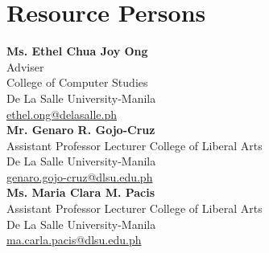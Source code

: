 %
%
%                 

\chapter{Resource Persons}
\label{sec:appendixa}

\newcommand{\resperson}[4]{\textbf{#1} \\ #2 \\ #3 \\ \url{#4}\vspace{0.5em}\\}

\resperson{Ms. Ethel Chua Joy Ong}{Adviser}{College of Computer Studies\\De La Salle University-Manila}{ethel.ong@delasalle.ph}
\resperson{Mr. Genaro R. Gojo-Cruz}{Assistant Professor Lecturer College of Liberal Arts}{De La Salle University-Manila}{genaro.gojo-cruz@dlsu.edu.ph}
\resperson{Ms. Maria Clara M. Pacis}{Assistant Professor Lecturer College of Liberal Arts}{De La Salle University-Manila}{ma.carla.pacis@dlsu.edu.ph}